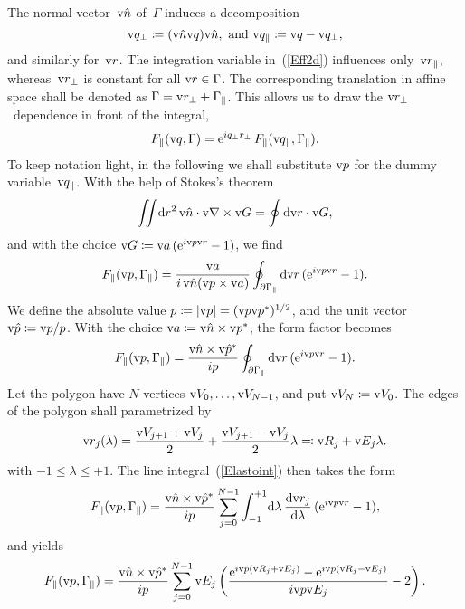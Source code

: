 The normal vector~$\text{v}{\hat n}$ of~$\Gamma$ induces a decomposition
\begin{equation}
  \text{v}{q}_\perp\coloneqq(\text{v}{\hat n}\text{v}{q})\text{v}{\hat n},\text{~and~}\text{v}{q}_\parallel\coloneqq\text{v}{q}-\text{v}{q}_\perp,
\end{equation}
and similarly for~$\text{v}{r}$.
The integration variable in~(\ref{Eff2d}) influences only~$\text{v}{r}_\parallel$,
whereas~$\text{v}{r}_\perp$ is constant for all $\text{v}{r}\in\Gamma$.
The corresponding translation in affine space
shall be denoted as $\Gamma=\text{v}{r}_\perp+\Gamma_\parallel$.
This allows us to draw the $\text{v}{r}_\perp$~dependence in front of the integral,
\begin{equation}\label{EF2F2}
  F_\parallel(\text{v}{q},\Gamma)
  = \text{e}^{iq_\perp r_\perp}\,F_\parallel(\text{v}{q}_\parallel,\Gamma_\parallel).
\end{equation}
To keep notation light,
in the following we shall substitute $\text{v}{p}$ for the dummy variable~$\text{v}{q}_\parallel$.
With the help of Stokes's theorem
\begin{equation}\label{EStokes}
  \iint\!\text{d} r^2\,\text{v}{\hat n}\cdot\text{v}{\nabla}\times\text{v}{G} = \oint \text{d}\text{v}{r}\cdot\text{v}{G},
\end{equation}
and with the choice $\text{v}{G}\coloneqq\text{v}{a}\, (\text{e}^{i\text{v}{p}\text{v}{r}}-1)$,
we find
\begin{equation}
  F_\parallel(\text{v}{p},\Gamma_\parallel)=\frac{\text{v}{a}}{i\, \text{v}{\hat n}(\text{v}{p}\times\text{v}{a})} \oint_{\partial\Gamma_\parallel} \text{d}\text{v}{r}\,(\text{e}^{i\text{v}{p}\text{v}{r}}-1).
\end{equation}
We define the absolute value
$p\coloneqq|\text{v}{p}|=(\text{v}{p}\text{v}{p}^*)^{1/2}$,
and the unit vector $\text{v}{\hat p}\coloneqq\text{v}{p}/p$.
With the choice $\text{v}{a}\coloneqq\text{v}{\hat n}\times\text{v}{p}^*$,
the form factor becomes
\begin{equation}\label{Elastoint}
  F_\parallel(\text{v}{p},\Gamma_\parallel)=\frac{\text{v}{\hat n}\times\text{v}{\hat p}^*}{ip} \oint_{\partial\Gamma_\parallel} \text{d}\text{v}{r}\,(\text{e}^{i\text{v}{p}\text{v}{r}}-1).
\end{equation}
Let the polygon have $N$ vertices $\text{v}{V}_0,\ldots,\text{v}{V}_{N-1}$,
and put $\text{v}{V}_N\coloneqq\text{v}{V}_0$.
The edges of the polygon shall parametrized by
\begin{equation}
  \text{v}{r}_j(\lambda) = \frac{\text{v}{V}_{j+1}+\text{v}{V}_j}{2} + \frac{\text{v}{V}_{j+1}-\text{v}{V}_j}{2} \lambda
  \eqqcolon \text{v}{R}_j + \text{v}{E}_j\lambda.
\end{equation}
with $-1\le\lambda\le+1$.
The line integral~(\ref{Elastoint}) then takes the form
\begin{equation}
    F_\parallel(\text{v}{p},\Gamma_\parallel)
   = \frac{\text{v}{\hat n}\times\text{v}{\hat p}^*}{ip} \sum_{j=0}^{N-1}
              \int_{-1}^{+1}\!\text{d}\lambda\, \frac{\text{d}\text{v}{r}_j}{\text{d}\lambda}\,(\text{e}^{i\text{v}{p}\text{v}{r}}-1),
\end{equation}
and yields
\begin{equation}\label{Effpolygon1}
    F_\parallel(\text{v}{p},\Gamma_\parallel)
    = \frac{\text{v}{\hat n}\times\text{v}{\hat p}^*}{ip}
      \sum_{j=0}^{N-1} \text{v}{E}_j
      \left( \frac{\text{e}^{i\text{v}{p}(\text{v}{R}_j+\text{v}{E}_j)}-\text{e}^{i\text{v}{p}(\text{v}{R}_j-\text{v}{E}_j)}}{i\text{v}{p}\text{v}{E}_j} - 2 \right).
\end{equation}
